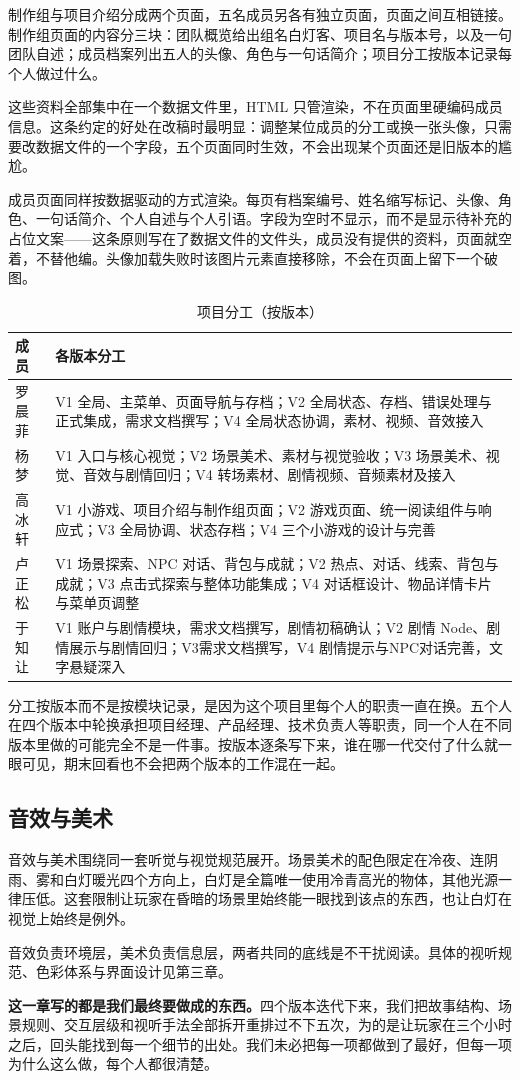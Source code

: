 制作组与项目介绍分成两个页面，五名成员另各有独立页面，页面之间互相链接。制作组页面的内容分三块：团队概览给出组名白灯客、项目名与版本号，以及一句团队自述；成员档案列出五人的头像、角色与一句话简介；项目分工按版本记录每个人做过什么。

这些资料全部集中在一个数据文件里，HTML 只管渲染，不在页面里硬编码成员信息。这条约定的好处在改稿时最明显：调整某位成员的分工或换一张头像，只需要改数据文件的一个字段，五个页面同时生效，不会出现某个页面还是旧版本的尴尬。

成员页面同样按数据驱动的方式渲染。每页有档案编号、姓名缩写标记、头像、角色、一句话简介、个人自述与个人引语。字段为空时不显示，而不是显示待补充的占位文案——这条原则写在了数据文件的文件头，成员没有提供的资料，页面就空着，不替他编。头像加载失败时该图片元素直接移除，不会在页面上留下一个破图。

\begin{table}[htbp]
\centering
\caption{项目分工（按版本）}
\small
\begin{tabularx}{\linewidth}{@{}l X@{}}
\toprule
成员 & 各版本分工 \\
\midrule
罗晨菲 & V1 全局、主菜单、页面导航与存档；V2 全局状态、存档、错误处理与正式集成，需求文档撰写；V4 全局状态协调，素材、视频、音效接入 \\
杨梦 & V1 入口与核心视觉；V2 场景美术、素材与视觉验收；V3 场景美术、视觉、音效与剧情回归；V4 转场素材、剧情视频、音频素材及接入 \\
高冰轩 & V1 小游戏、项目介绍与制作组页面；V2 游戏页面、统一阅读组件与响应式；V3 全局协调、状态存档；V4 三个小游戏的设计与完善 \\
卢正松 & V1 场景探索、NPC 对话、背包与成就；V2 热点、对话、线索、背包与成就；V3 点击式探索与整体功能集成；V4 对话框设计、物品详情卡片与菜单页调整 \\
于知让 & V1 账户与剧情模块，需求文档撰写，剧情初稿确认；V2 剧情 Node、剧情展示与剧情回归；V3需求文档撰写，V4 剧情提示与NPC对话完善，文字悬疑深入 \\
\bottomrule
\end{tabularx}
\end{table}

分工按版本而不是按模块记录，是因为这个项目里每个人的职责一直在换。五个人在四个版本中轮换承担项目经理、产品经理、技术负责人等职责，同一个人在不同版本里做的可能完全不是一件事。按版本逐条写下来，谁在哪一代交付了什么就一眼可见，期末回看也不会把两个版本的工作混在一起。

\subsection{音效与美术}

音效与美术围绕同一套听觉与视觉规范展开。场景美术的配色限定在冷夜、连阴雨、雾和白灯暖光四个方向上，白灯是全篇唯一使用冷青高光的物体，其他光源一律压低。这套限制让玩家在昏暗的场景里始终能一眼找到该点的东西，也让白灯在视觉上始终是例外。

音效负责环境层，美术负责信息层，两者共同的底线是不干扰阅读。具体的视听规范、色彩体系与界面设计见第三章。

\textbf{这一章写的都是我们最终要做成的东西。}四个版本迭代下来，我们把故事结构、场景规则、交互层级和视听手法全部拆开重排过不下五次，为的是让玩家在三个小时之后，回头能找到每一个细节的出处。我们未必把每一项都做到了最好，但每一项为什么这么做，每个人都很清楚。

